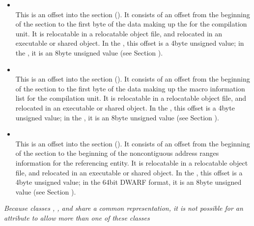 \begin{itemize}
\item {} \\
This is an offset into the 
\dotdebugloc{}
section
(). 
It consists of an offset from the
beginning of the 
\dotdebugloc{}
section to the first byte of
the data making up the 
 for the compilation
unit. 
It is relocatable in a relocatable object file, and
relocated in an executable or shared object. In the 
\thirtytwobitdwarfformat, this offset is a 4\dash byte unsigned value;
in the \sixtyfourbitdwarfformat, it is an 8\dash byte unsigned value
(see Section ).


\item {} \\
This is an 
offset into the 
\dotdebugmacinfo{} section
(). 
It consists of an offset from the
beginning of the \dotdebugmacinfo{} 
section to the first byte of
the data making up the macro information list for the compilation
unit. 
It is relocatable in a relocatable object file, and
relocated in an executable or shared object. In the 
\thirtytwobitdwarfformat, this offset is a 4\dash byte unsigned value;
in the \sixtyfourbitdwarfformat, it is an 8\dash byte unsigned value
(see Section ).

\item {} \\
This is an 
offset into the \dotdebugranges{} section
(). 
It consists of an
offset from the beginning of the 
\dotdebugranges{} section
to the beginning of the non\dash contiguous address ranges
information for the referencing entity.  
It is relocatable in
a relocatable object file, and relocated in an executable or
shared object. In the \thirtytwobitdwarfformat, this offset
is a 4\dash byte unsigned value; in the 64\dash bit DWARF
format, it is an 8\dash byte unsigned value (see Section
).
\end{itemize}

\textit{Because classes , 
, 
 and 
share a common representation, it is not possible for an
attribute to allow more than one of these classes}


